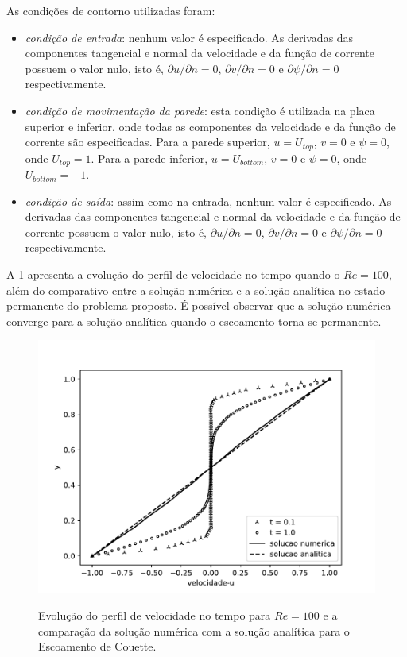 \medskip
\noindent
As condições de contorno utilizadas foram:

\begin{itemize}
     \item \textit{condição de entrada}: nenhum valor é especificado. As derivadas das
      componentes tangencial e normal da velocidade e da função de corrente possuem o 
      valor nulo, isto é,
      $\partial u/\partial n = 0$,
      $\partial v/\partial n = 0$ e
      $\partial \psi/\partial n = 0$ respectivamente.

     \item \textit{condição de movimentação da parede}: esta condição é utilizada na placa superior e inferior, 
      onde todas as componentes da velocidade e da função de corrente são especificadas.
      Para a parede superior, $u=U_{top}$, $v=0$ e $\psi=0$, onde $U_{top} = 1$.
      Para a parede inferior, $u=U_{bottom}$, $v=0$ e $\psi=0$, onde $U_{bottom} = -1$.

     \item \textit{condição de saída}: assim como na entrada, nenhum valor é especificado. As derivadas das
      componentes tangencial e normal da velocidade e da função de corrente possuem o 
      valor nulo, isto é,
      $\partial u/\partial n = 0$,
      $\partial v/\partial n = 0$ e
      $\partial \psi/\partial n = 0$ respectivamente.
\end{itemize}


\newpage
A \ref{velocidade couette} apresenta a evolução 
do perfil de velocidade no tempo quando o $Re=100$, além do comparativo
entre a solução numérica e a solução analítica no estado permanente do
problema proposto. É possível observar que a solução numérica converge
para a solução analítica quando o escoamento torna-se permanente.


\begin{figure}[H]
     \centering
     \includegraphics[scale=1]{./02_chaps/cap_validation/figure/couette_velocity.pdf}\\
     \medskip
     \caption{Evolução do perfil de velocidade no tempo para $Re=100$ e
     a comparação da solução numérica com a solução analítica para o Escoamento de Couette.}
     \label{velocidade couette}
\end{figure}

\newpage
